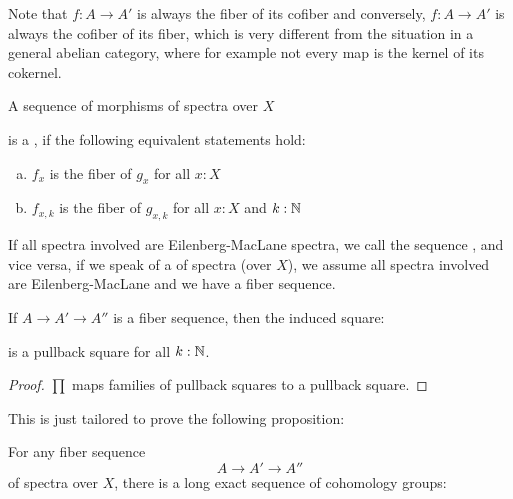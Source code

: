 Note that $f:A\to A'$ is always the fiber of its cofiber and conversely, $f:A\to A'$ is always the cofiber of its fiber, which is very different from the situation in a general abelian category,
where for example not every map is the kernel of its cokernel.

\begin{definition}
  A sequence of morphisms of spectra over $X$
  \begin{center}
  \end{center}
  is a , if the following equivalent statements hold:
  \begin{enumerate}[(a)]
  \item $f_x$ is the fiber of $g_x$ for all $x:X$
  \item $f_{x,k}$ is the fiber of $g_{x,k}$ for all $x:X$ and $k:\mathbb{N}$
  \end{enumerate}
  If all spectra involved are Eilenberg-MacLane spectra, we call the sequence , and vice versa,
  if we speak of a  of spectra (over $X$), we assume all spectra involved are Eilenberg-MacLane and we have a fiber sequence.
\end{definition}

\begin{lemma}
  If $A\to A'\to A''$ is a fiber sequence, then the induced square:
  \begin{center}
  \end{center}
  is a pullback square for all $k:\mathbb{N}$.
\end{lemma}
\begin{proof}
  $\prod$ maps families of pullback squares to a pullback square.
\end{proof}

This is just tailored to prove the following proposition:

\begin{proposition}
  For any fiber sequence
  \[ A\to A'\to A'' \]
  of spectra over $X$, there is a long exact sequence of cohomology groups:
  \begin{center}
  \end{center}
\end{proposition}

